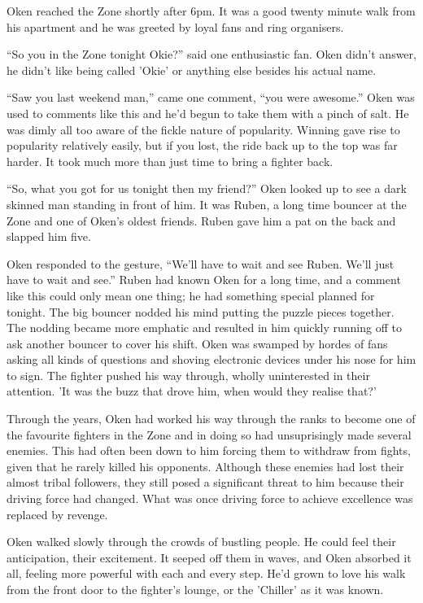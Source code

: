 \thoughtbreak

Oken reached the Zone shortly after 6pm. It was a good twenty minute walk from his apartment and he was greeted by loyal fans and ring organisers.

``So you in the Zone tonight Okie?'' said one enthusiastic fan. Oken didn't answer, he didn't like being called 'Okie' or anything else besides his actual name.

``Saw you last weekend man,'' came one comment, ``you were awesome.'' Oken was used to comments like this and he'd begun to take them with a pinch of salt. He was dimly all too aware of the fickle nature of popularity. Winning gave rise to popularity relatively easily, but if you lost, the ride back up to the top was far harder. It took much more than just time to bring a fighter back.

``So, what you got for us tonight then my friend?'' Oken looked up to see a dark skinned man standing in front of him. It was Ruben, a long time bouncer at the Zone and one of Oken's oldest friends. Ruben gave him a pat on the back and slapped him five.

Oken responded to the gesture, ``We'll have to wait and see Ruben. We'll just have to wait and see.'' Ruben had known Oken for a long time, and a comment like this could only mean one thing; he had something special planned for tonight. The big bouncer nodded his mind putting the puzzle pieces together. The nodding became more emphatic and resulted in him quickly running off to ask another bouncer to cover his shift. Oken was swamped by hordes of fans asking all kinds of questions and shoving electronic devices under his nose for him to sign. The fighter pushed his way through, wholly uninterested in their attention. 'It was the buzz that drove him, when would they realise that?'

Through the years, Oken had worked his way through the ranks to become one of the favourite fighters in the Zone and in doing so had unsuprisingly made several enemies. This had often been down to him forcing them to withdraw from fights, given that he rarely killed his opponents. Although these enemies had lost their almost tribal followers, they still posed a significant threat to him because their driving force had changed. What was once driving force to achieve excellence was replaced by revenge.

Oken walked slowly through the crowds of bustling people. He could feel their anticipation, their excitement. It seeped off them in waves, and Oken absorbed it all, feeling more powerful with each and every step. He'd grown to love his walk from the front door to the fighter's lounge, or the 'Chiller' as it was known.

